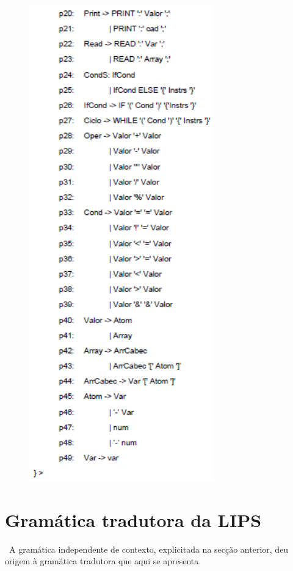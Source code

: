 \documentclass{report}
\begin{document}
\begin{figure}[h]
\centering
\includegraphics[width=80mm, scale=0.5]{gic2.PNG}
\end{figure}


\chapter{Gramática tradutora da LIPS} \
A gramática independente de contexto, explicitada na secção anterior, deu origem à gramática tradutora que aqui se apresenta. 
\end{document}
